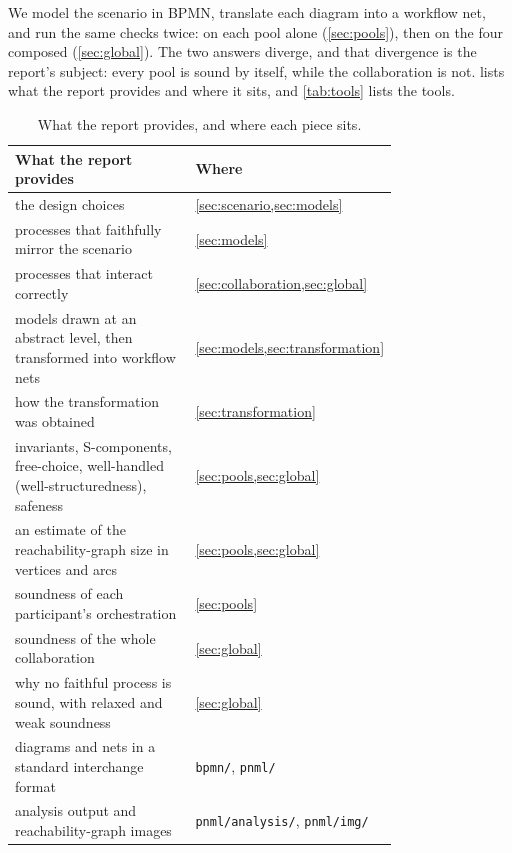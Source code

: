We model the scenario in BPMN, translate each diagram into a workflow net, and run the same checks twice: on each pool alone (\cref{sec:pools}), then on the four composed (\cref{sec:global}). The two answers diverge, and that divergence is the report's subject: every pool is sound by itself, while the collaboration is not.  lists what the report provides and where it sits, and \cref{tab:tools} lists the tools.

\begin{table}[htbp]
  \centering
  \renewcommand{\arraystretch}{1.08}
  \begin{tabular}{@{}>{\raggedright\arraybackslash}p{0.76\linewidth}>{\raggedright\arraybackslash}p{}@{}}
    \toprule
    \textbf{What the report provides} & \textbf{Where} \\
    \midrule
    the design choices & \cref{sec:scenario,sec:models} \\
    processes that faithfully mirror the scenario & \cref{sec:models} \\
    processes that interact correctly & \cref{sec:collaboration,sec:global} \\
    models drawn at an abstract level, then transformed into workflow nets & \cref{sec:models,sec:transformation} \\
    how the transformation was obtained & \cref{sec:transformation} \\
    invariants, S-components, free-choice, well-handled (well-structuredness), safeness & \cref{sec:pools,sec:global} \\
    an estimate of the reachability-graph size in vertices and arcs & \cref{sec:pools,sec:global} \\
    soundness of each participant's orchestration & \cref{sec:pools} \\
    soundness of the whole collaboration & \cref{sec:global} \\
    why no faithful process is sound, with relaxed and weak soundness & \cref{sec:global} \\
    \midrule
    diagrams and nets in a standard interchange format & \texttt{bpmn/}, \texttt{pnml/} \\
    analysis output and reachability-graph images & \texttt{pnml/analysis/}, \texttt{pnml/img/} \\
    \bottomrule
  \end{tabular}
  \caption{What the report provides, and where each piece sits.}
  \label{tab:compliance}
\end{table}

